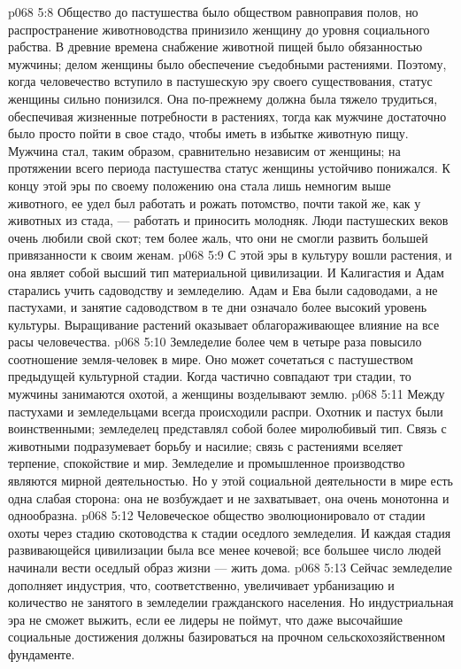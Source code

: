 \vs p068 5:8 Общество до пастушества было обществом равноправия полов, но распространение животноводства принизило женщину до уровня социального рабства. В древние времена снабжение животной пищей было обязанностью мужчины; делом женщины было обеспечение съедобными растениями. Поэтому, когда человечество вступило в пастушескую эру своего существования, статус женщины сильно понизился. Она по\hyp{}прежнему должна была тяжело трудиться, обеспечивая жизненные потребности в растениях, тогда как мужчине достаточно было просто пойти в свое стадо, чтобы иметь в избытке животную пищу. Мужчина стал, таким образом, сравнительно независим от женщины; на протяжении всего периода пастушества статус женщины устойчиво понижался. К концу этой эры по своему положению она стала лишь немногим выше животного, ее удел был работать и рожать потомство, почти такой же, как у животных из стада, --- работать и приносить молодняк. Люди пастушеских веков очень любили свой скот; тем более жаль, что они не смогли развить большей привязанности к своим женам.
\vs p068 5:9 \pc {}\bibnobreakspace {} С этой эры в культуру вошли растения, и она являет собой высший тип материальной цивилизации. И Калигастия и Адам старались учить садоводству и земледелию. Адам и Ева были садоводами, а не пастухами, и занятие садоводством в те дни означало более высокий уровень культуры. Выращивание растений оказывает облагораживающее влияние на все расы человечества.
\vs p068 5:10 Земледелие более чем в четыре раза повысило соотношение земля\hyp{}человек в мире. Оно может сочетаться с пастушеством предыдущей культурной стадии. Когда частично совпадают три стадии, то мужчины занимаются охотой, а женщины возделывают землю.
\vs p068 5:11 Между пастухами и земледельцами всегда происходили распри. Охотник и пастух были воинственными; земледелец представлял собой более миролюбивый тип. Связь с животными подразумевает борьбу и насилие; связь с растениями вселяет терпение, спокойствие и мир. Земледелие и промышленное производство являются мирной деятельностью. Но у этой социальной деятельности в мире есть одна слабая сторона: она не возбуждает и не захватывает, она очень монотонна и однообразна.
\vs p068 5:12 \pc Человеческое общество эволюционировало от стадии охоты через стадию скотоводства к стадии оседлого земледелия. И каждая стадия развивающейся цивилизации была все менее кочевой; все большее число людей начинали вести оседлый образ жизни --- жить дома.
\vs p068 5:13 Сейчас земледелие дополняет индустрия, что, соответственно, увеличивает урбанизацию и количество не занятого в земледелии гражданского населения. Но индустриальная эра не сможет выжить, если ее лидеры не поймут, что даже высочайшие социальные достижения должны базироваться на прочном сельскохозяйственном фундаменте.
